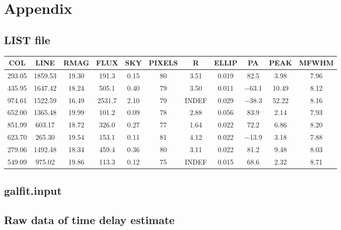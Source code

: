 \appendix
\chapter{Appendix}
\section{LIST file}\label{app:LIST}
\begin{tabular}{ccccccccccc}
   \toprule
COL & LINE & RMAG & FLUX & SKY & PIXELS & R & ELLIP & PA & PEAK & MFWHM\\
\midrule
\num{293.05} & \num{1859.53} & \num{19.30} & \num{191.3} & \num{0.15} & \num{80} & \num{3.51} & \num{0.019} & \num{82.5} & \num{3.98} & \num{7.96}\\
\num{435.95} & \num{1647.42} & \num{18.24} & \num{505.1} & \num{0.40} & \num{79} & \num{3.50} & \num{0.011} & \num{-63.1} & \num{10.49} & \num{8.12}\\
\num{974.61} & \num{1522.59} & \num{16.49} & \num{2531.7} & \num{2.10} & \num{79} & INDEF & \num{0.029} & \num{-38.3} & \num{52.22} & \num{8.16}\\
\num{652.00} & \num{1365.48} & \num{19.99} & \num{101.2} & \num{0.09} & \num{78} & \num{2.88} & \num{0.056} & \num{83.9} & \num{2.14} & \num{7.93}\\
\num{851.99} & \num{603.17} & \num{18.72} & \num{326.0} & \num{0.27} & \num{77} & \num{1.64} & \num{0.022} & \num{72.2} & \num{6.86} & \num{8.20}\\
\num{623.70} & \num{265.30} & \num{19.54} & \num{153.1} & \num{0.11} & \num{81} & \num{4.12} & \num{0.022} & \num{-13.9} & \num{3.18} & \num{7.88}\\
\num{279.06} & \num{1492.48} & \num{18.34} & \num{459.4} & \num{0.36} & \num{80} & \num{3.11} & \num{0.022} & \num{81.2} & \num{9.48} & \num{8.03}\\
\num{549.09} & \num{975.02} & \num{19.86} & \num{113.3} & \num{0.12} & \num{75} & INDEF & \num{0.015} & \num{68.6} & \num{2.32} & \num{8.71}\\
\bottomrule
\end{tabular}

\section{galfit.input}\label{app:galfit}


\section{Raw data of time delay estimate}\label{app:timdel}

